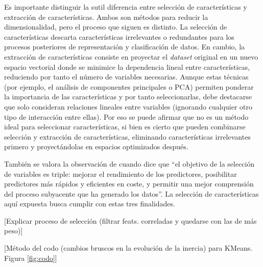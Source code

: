 Es importante distinguir la sutil diferencia entre selección de características y extracción de características.
Ambos son métodos para reducir la dimensionalidad, pero el proceso que siguen es distinto.
La selección de características descarta características irrelevantes o redundantes para los procesos posteriores de representación y clasificación de datos.
En cambio, la extracción de características consiste en proyectar el \emph{dataset} original en un nuevo espacio vectorial
donde se minimice la dependencia lineal entre características, reduciendo por tanto el número de variables necesarias.
Aunque estas técnicas (por ejemplo, el análisis de componentes principales o PCA) permiten ponderar la importancia de las características y por tanto seleccionarlas,
debe destacarse que solo consideran relaciones lineales entre variables (ignorando cualquier otro tipo de interacción entre ellas).
Por eso se puede afirmar que no es un método ideal para seleccionar características, si bien es cierto
que pueden combinarse selección y extracción de características, eliminando características irrelevantes primero y proyectándolas en espacios optimizados después.

También se valora la observación de \cite{Guyon_2003} cuando dice que ``el objetivo de la selección de variables es triple: mejorar el rendimiento de los predictores, posibilitar predictores más rápidos y eficientes en coste, y permitir una mejor comprensión del proceso subyacente que ha generado los datos''.
La selección de características aquí expuesta busca cumplir con estas tres finalidades.

[Explicar proceso de selección (filtrar feats. correladas y quedarse con las de más peso)]

[Método del codo (cambios bruscos en la evolución de la inercia) para KMeans. Figura \ref{fig:codo}]

